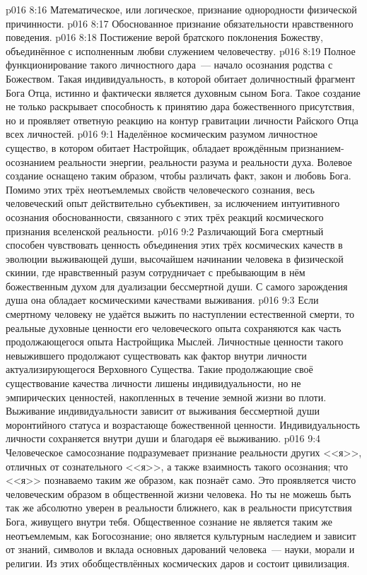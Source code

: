 \vs p016 8:16 Математическое, или логическое, признание однородности физической причинности.
\vs p016 8:17 Обоснованное признание обязательности нравственного поведения.
\vs p016 8:18 Постижение верой братского поклонения Божеству, объединённое с исполненным любви служением человечеству.
\vs p016 8:19 \pc Полное функционирование такого личностного дара~--- начало осознания родства с Божеством. Такая индивидуальность, в которой обитает доличностный фрагмент Бога Отца, истинно и фактически является духовным сыном Бога. Такое создание не только раскрывает способность к принятию дара божественного присутствия, но и проявляет ответную реакцию на контур гравитации личности Райского Отца всех личностей.
\vs p016 9:1 Наделённое космическим разумом личностное существо, в котором обитает Настройщик, обладает врождённым признанием\hyp{}осознанием реальности энергии, реальности разума и реальности духа. Волевое создание оснащено таким образом, чтобы различать факт, закон и любовь Бога. Помимо этих трёх неотъемлемых свойств человеческого сознания, весь человеческий опыт действительно субъективен, за ислючением интуитивного осознания обоснованности, связанного с  этих трёх реакций космического признания вселенской реальности.
\vs p016 9:2 Различающий Бога смертный способен чувствовать ценность объединения этих трёх космических качеств в эволюции выживающей души, высочайшем начинании человека в физической скинии, где нравственный разум сотрудничает с пребывающим в нём божественным духом для дуализации бессмертной души. С самого зарождения душа  она обладает космическими качествами выживания.
\vs p016 9:3 Если смертному человеку не удаётся выжить по наступлении естественной смерти, то реальные духовные ценности его человеческого опыта сохраняются как часть продолжающегося опыта Настройщика Мыслей. Личностные ценности такого невыжившего продолжают существовать как фактор внутри личности актуализирующегося Верховного Существа. Такие продолжающие своё существование качества личности лишены индивидуальности, но не эмпирических ценностей, накопленных в течение земной жизни во плоти. Выживание индивидуальности зависит от выживания бессмертной души моронтийного статуса и возрастающе божественной ценности. Индивидуальность личности сохраняется внутри души и благодаря её выживанию.
\vs p016 9:4 \pc Человеческое самосознание подразумевает признание реальности других <<я>>, отличных от сознательного <<я>>, а также взаимность такого осознания; что <<я>> познаваемо таким же образом, как познаёт само. Это проявляется чисто человеческим образом в общественной жизни человека. Но ты не можешь быть так же абсолютно уверен в реальности ближнего, как в реальности присутствия Бога, живущего внутри тебя. Общественное сознание не является таким же неотъемлемым, как Богосознание; оно является культурным наследием и зависит от знаний, символов и вклада основных дарований человека~--- науки, морали и религии. Из этих обобществлённых космических даров и состоит цивилизация.
